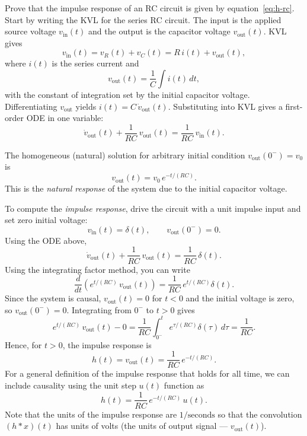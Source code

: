 \documentclass{ee102_notes}
\begin{document}
\begin{popquiz}
Prove that the impulse response of an RC circuit is given by equation~\eqref{eq:h-rc}.
\popqsplit
Start by writing the KVL for the series RC circuit. The input is the applied source voltage $v_{\text{in}}(t)$ and the output is the capacitor voltage $v_{\text{out}}(t)$. KVL gives
\[
v_{\text{in}}(t)=v_R(t)+v_C(t)=R\,i(t)+v_{\text{out}}(t),
\]
where $i(t)$ is the series current and
\[
v_{\text{out}}(t)=\frac{1}{C}\int i(t)\,dt,
\]
with the constant of integration set by the initial capacitor voltage. Differentiating $v_{\text{out}}$ yields $i(t)=C\,\dot v_{\text{out}}(t)$. Substituting into KVL gives a first-order ODE in one variable:
\[
\dot v_{\text{out}}(t)+\frac{1}{RC}\,v_{\text{out}}(t)=\frac{1}{RC}\,v_{\text{in}}(t).
\]

The homogeneous (natural) solution for arbitrary initial condition $v_{\text{out}}(0^-)=v_0$ is
\[
v_{\text{out}}(t)=v_0\,e^{-t/(RC)}.
\]
This is the \emph{natural response} of the system due to the initial capacitor voltage.

To compute the \emph{impulse response}, drive the circuit with a unit impulse input and set zero initial voltage:
\[
v_{\text{in}}(t)=\delta(t),\qquad v_{\text{out}}(0^-)=0.
\]
Using the ODE above,
\[
\dot v_{\text{out}}(t)+\frac{1}{RC}\,v_{\text{out}}(t)=\frac{1}{RC}\,\delta(t).
\]
Using the integrating factor method, you can write 
\[
\frac{d}{dt}\!\left(e^{t/(RC)}\,v_{\text{out}}(t)\right)=\frac{1}{RC}\,e^{t/(RC)}\delta(t).
\]
Since the system is causal, $v_{\text{out}}(t)=0$ for $t<0$ and the initial voltage is zero, so $v_{\text{out}}(0^-)=0$. Integrating from $0^-$ to $t>0$ gives
\[
e^{t/(RC)}\,v_{\text{out}}(t)-0=\frac{1}{RC}\!\int_{0^-}^{t}\!e^{\tau/(RC)}\delta(\tau)\,d\tau
=\frac{1}{RC}.
\]
Hence, for $t > 0$, the impulse response is 
\[
h(t) = v_{\text{out}}(t)=\frac{1}{RC}\,e^{-t/(RC)}.
\]
For a general definition of the impulse response that holds for all time, we can include causality using the unit step $u(t)$ function as
\[
h(t)=\frac{1}{RC}\,e^{-t/(RC)}\,u(t).
\]
Note that the units of the impulse response are $1/\text{seconds}$ so that the convolution $(h*x)(t)$ has units of volts (the units of output signal --- $v_{\text{out}}(t)$).

\end{popquiz}
\end{document}
